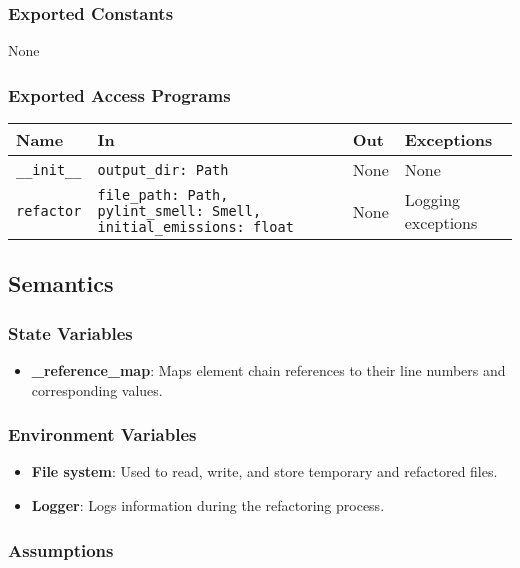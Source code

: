 \documentclass[12pt, titlepage]{article}
\begin{document}
\subsubsection{Exported Constants}
None

\subsubsection{Exported Access Programs}

\begin{center}
\begin{tabular}{|p{3cm}|p{5cm}|p{2cm}|p{3cm}|}
\hline
\textbf{Name} & \textbf{In} & \textbf{Out} & \textbf{Exceptions} \\
\hline
\texttt{\_\_init\_\_} & \texttt{output\_dir: Path} & None & None \\
\hline
\texttt{refactor} & \texttt{file\_path: Path, pylint\_smell: Smell, initial\_emissions: float} & None & Logging exceptions \\
\hline
\end{tabular}
\end{center}

\subsection{Semantics}

\subsubsection{State Variables}

\begin{itemize}
  \item \textbf{\_reference\_map}: Maps element chain references to their line numbers and corresponding values.
\end{itemize}

\subsubsection{Environment Variables}

\begin{itemize}
  \item \textbf{File system}: Used to read, write, and store temporary and refactored files.
  \item \textbf{Logger}: Logs information during the refactoring process.
\end{itemize}

\subsubsection{Assumptions}
\end{document}
